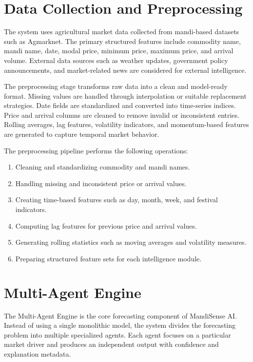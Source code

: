 \documentclass[12pt,a4paper]{report}
\begin{document}
\section{Data Collection and Preprocessing}

The system uses agricultural market data collected from mandi-based datasets such as Agmarknet. The primary structured features include commodity name, mandi name, date, modal price, minimum price, maximum price, and arrival volume. External data sources such as weather updates, government policy announcements, and market-related news are considered for external intelligence.

The preprocessing stage transforms raw data into a clean and model-ready format. Missing values are handled through interpolation or suitable replacement strategies. Date fields are standardized and converted into time-series indices. Price and arrival columns are cleaned to remove invalid or inconsistent entries. Rolling averages, lag features, volatility indicators, and momentum-based features are generated to capture temporal market behavior.

The preprocessing pipeline performs the following operations:

\begin{enumerate}
    \item Cleaning and standardizing commodity and mandi names.
    \item Handling missing and inconsistent price or arrival values.
    \item Creating time-based features such as day, month, week, and festival indicators.
    \item Computing lag features for previous price and arrival values.
    \item Generating rolling statistics such as moving averages and volatility measures.
    \item Preparing structured feature sets for each intelligence module.
\end{enumerate}

\section{Multi-Agent Engine}

The Multi-Agent Engine is the core forecasting component of MandiSense AI. Instead of using a single monolithic model, the system divides the forecasting problem into multiple specialized agents. Each agent focuses on a particular market driver and produces an independent output with confidence and explanation metadata.
\end{document}
